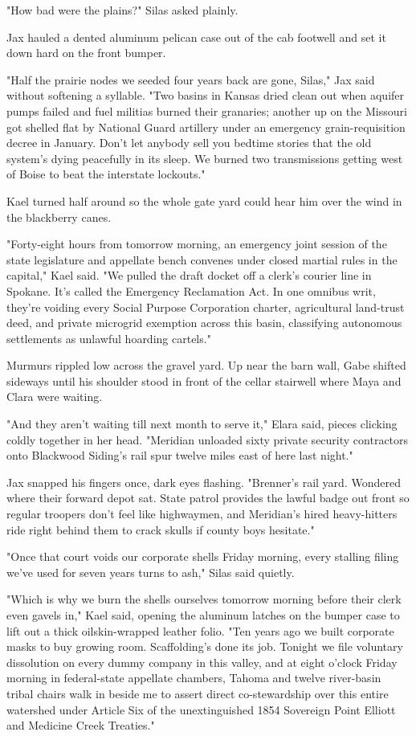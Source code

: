 "How bad were the plains?" Silas asked plainly.

Jax hauled a dented aluminum pelican case out of the cab footwell and set it down hard on the front bumper.

"Half the prairie nodes we seeded four years back are gone, Silas," Jax said without softening a syllable. "Two basins in Kansas dried clean out when aquifer pumps failed and fuel militias burned their granaries; another up on the Missouri got shelled flat by National Guard artillery under an emergency grain-requisition decree in January. Don't let anybody sell you bedtime stories that the old system's dying peacefully in its sleep. We burned two transmissions getting west of Boise to beat the interstate lockouts."

Kael turned half around so the whole gate yard could hear him over the wind in the blackberry canes.

"Forty-eight hours from tomorrow morning, an emergency joint session of the state legislature and appellate bench convenes under closed martial rules in the capital," Kael said. "We pulled the draft docket off a clerk's courier line in Spokane. It's called the Emergency Reclamation Act. In one omnibus writ, they're voiding every Social Purpose Corporation charter, agricultural land-trust deed, and private microgrid exemption across this basin, classifying autonomous settlements as unlawful hoarding cartels."

Murmurs rippled low across the gravel yard. Up near the barn wall, Gabe shifted sideways until his shoulder stood in front of the cellar stairwell where Maya and Clara were waiting.

"And they aren't waiting till next month to serve it," Elara said, pieces clicking coldly together in her head. "Meridian unloaded sixty private security contractors onto Blackwood Siding's rail spur twelve miles east of here last night."

Jax snapped his fingers once, dark eyes flashing. "Brenner's rail yard. Wondered where their forward depot sat. State patrol provides the lawful badge out front so regular troopers don't feel like highwaymen, and Meridian's hired heavy-hitters ride right behind them to crack skulls if county boys hesitate."

"Once that court voids our corporate shells Friday morning, every stalling filing we've used for seven years turns to ash," Silas said quietly.

"Which is why we burn the shells ourselves tomorrow morning before their clerk even gavels in," Kael said, opening the aluminum latches on the bumper case to lift out a thick oilskin-wrapped leather folio. "Ten years ago we built corporate masks to buy growing room. Scaffolding's done its job. Tonight we file voluntary dissolution on every dummy company in this valley, and at eight o'clock Friday morning in federal-state appellate chambers, Tahoma and twelve river-basin tribal chairs walk in beside me to assert direct co-stewardship over this entire watershed under Article Six of the unextinguished 1854 Sovereign Point Elliott and Medicine Creek Treaties."

